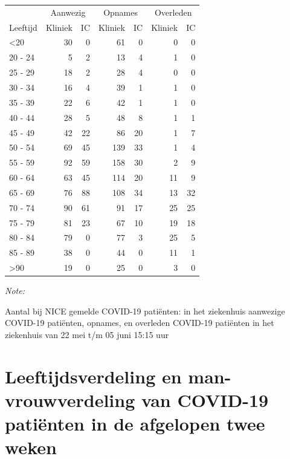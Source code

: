 \documentclass[
  english,
  man,floatsintext]{apa6}
\begin{document}
\begin{table}
\centering\begingroup\fontsize{10}{12}\selectfont

\begin{threeparttable}
\begin{tabular}{lrrrrrr}
\toprule
\multicolumn{1}{c}{ } & \multicolumn{2}{c}{Aanwezig} & \multicolumn{2}{c}{Opnames} & \multicolumn{2}{c}{Overleden} \\
\cmidrule(l{3pt}r{3pt}){2-3} \cmidrule(l{3pt}r{3pt}){4-5} \cmidrule(l{3pt}r{3pt}){6-7}
Leeftijd & Kliniek & IC & Kliniek & IC & Kliniek & IC\\
\midrule
<20 & 30 & 0 & 61 & 0 & 0 & 0\\
20 - 24 & 5 & 2 & 13 & 4 & 1 & 0\\
25 - 29 & 18 & 2 & 28 & 4 & 0 & 0\\
30 - 34 & 16 & 4 & 39 & 1 & 1 & 0\\
35 - 39 & 22 & 6 & 42 & 1 & 1 & 0\\
40 - 44 & 28 & 5 & 48 & 8 & 1 & 1\\
45 - 49 & 42 & 22 & 86 & 20 & 1 & 7\\
50 - 54 & 69 & 45 & 139 & 33 & 1 & 4\\
55 - 59 & 92 & 59 & 158 & 30 & 2 & 9\\
60 - 64 & 63 & 45 & 114 & 20 & 11 & 9\\
65 - 69 & 76 & 88 & 108 & 34 & 13 & 32\\
70 - 74 & 90 & 61 & 91 & 17 & 25 & 25\\
75 - 79 & 81 & 23 & 67 & 10 & 19 & 18\\
80 - 84 & 79 & 0 & 77 & 3 & 25 & 5\\
85 - 89 & 38 & 0 & 44 & 0 & 11 & 1\\
>90 & 19 & 0 & 25 & 0 & 3 & 0\\
\bottomrule
\end{tabular}
\begin{tablenotes}
\item \textit{Note: } 
\item Aantal bij NICE gemelde COVID-19 patiënten: in het ziekenhuis aanwezige COVID-19 patiënten, opnames, en overleden COVID-19 patiënten in het ziekenhuis van 22 mei t/m 05 juni 15:15 uur
\end{tablenotes}
\end{threeparttable}
\endgroup{}
\end{table}

\newpage

\hypertarget{leeftijdsverdeling-en-man-vrouwverdeling-van-covid-19-patiuxebnten-in-de-afgelopen-twee-weken}{%
\section{Leeftijdsverdeling en man-vrouwverdeling van COVID-19 patiënten in de afgelopen twee weken}\label{leeftijdsverdeling-en-man-vrouwverdeling-van-covid-19-patiuxebnten-in-de-afgelopen-twee-weken}}
\end{document}
